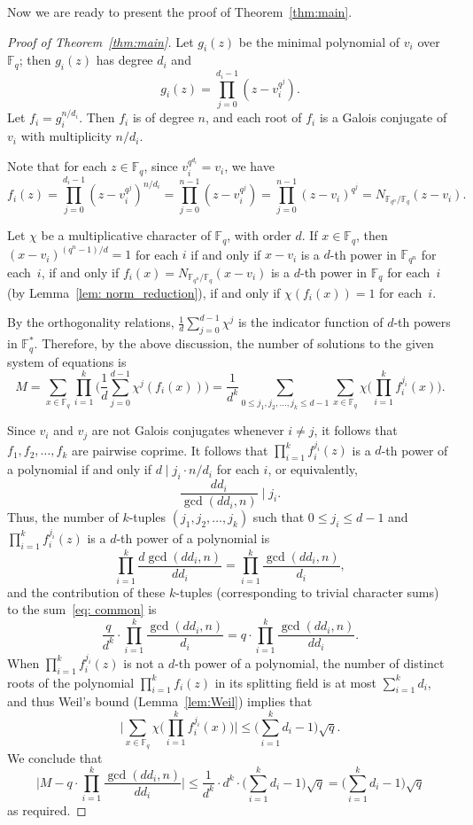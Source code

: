 \documentclass[12pt,reqno]{amsart}
\theoremstyle{definition}
\newcommand{\F}{\mathbb{F}}
\begin{document}
Now we are ready to present the proof of Theorem~\ref{thm:main}.

\begin{proof}[Proof of Theorem~\ref{thm:main}]
Let $g_i(z)$ be the minimal polynomial of $v_i$ over $\F_q$; then $g_i(z)$ has degree $d_i$ and 
$$
g_i(z)=\prod_{j=0}^{d_i-1} (z-v_i^{q^j}).
$$ 
Let $f_i=g_i^{n/d_i}$. Then $f_i$ is of degree $n$, and each root of $f_i$ is a Galois conjugate of $v_i$ with multiplicity $n/d_i$. 

Note that for each $z \in \F_q$, since $v_i^{q^{d_i}}=v_i$, we have
$$
f_i(z)=\prod_{j=0}^{d_i-1} (z-v_i^{q^j})^{n/d_i}=\prod_{j=0}^{n-1} (z-v_i^{q^j})=\prod_{j=0}^{n-1} (z-v_i)^{q^j}=N_{\F_{q^n}/\F_q}(z-v_i).
$$

Let $\chi$ be a multiplicative character of $\F_q$, with order $d$. If $x \in \F_q$, then $(x-v_i)^{(q^n-1)/d}=1$ for each $i$ if and only if $x-v_i$ is a $d$-th power in $\F_{q^n}$ for each~$i$, if and only if $f_i(x)=N_{\F_{q^n}/\F_q}(x-v_i)$ is a $d$-th power in $\F_q$ for each~$i$ (by Lemma~\ref{lem: norm_reduction}), if and only if $\chi(f_i(x))=1$ for each~$i$.

By the orthogonality relations, $\frac{1}{d} \sum_{j=0}^{d-1} \chi^j$ is the indicator function of $d$-th powers in $\F_q^*$. Therefore, by the above discussion, the number of solutions to the given system of equations is
\begin{equation} \label{eq: common}
 M=\sum_{x \in \F_q} \prod_{i=1}^k \bigg(\frac{1}{d} \sum_{j=0}^{d-1} \chi^j(f_i(x)) \bigg)=\frac{1}{d^k} \sum_{0 \leq j_1, j_2, \ldots, j_k \leq d-1}\sum_{x \in \F_q} \chi\bigg(\prod_{i=1}^k f_i^{j_i}(x)\bigg).   
\end{equation}

Since $v_i$ and $v_j$ are not Galois conjugates whenever $i \neq j$, it follows that $f_1, f_2, \ldots, f_k$ are pairwise coprime. It follows that $\prod_{i=1}^k f_i^{j_i}(z)$ is a $d$-th power of a polynomial if and only if $d \mid j_i \cdot n/d_i$ for each $i$, or equivalently,
$$
\frac{dd_i}{\gcd(dd_i,n)} \mid j_i.
$$
Thus, the number of $k$-tuples $(j_1,j_2, \ldots, j_k)$ such that $0 \leq j_i \leq d-1$ and $\prod_{i=1}^k f_i^{j_i}(z)$ is a $d$-th power of a polynomial is 
$$
\prod_{i=1}^k  \frac{d\gcd(dd_i,n)}{dd_i} =\prod_{i=1}^k  \frac{\gcd(dd_i,n)}{d_i} ,
$$
and the contribution of these $k$-tuples (corresponding to trivial character sums) to the sum~\eqref{eq: common} is
$$
\frac{q}{d^k} \cdot \prod_{i=1}^k  \frac{\gcd(dd_i,n)}{d_i}= q \cdot \prod_{i=1}^k  \frac{\gcd(dd_i,n)}{dd_i}.
$$
When $\prod_{i=1}^k f_i^{j_i}(z)$ is not a $d$-th power of a polynomial, the  number of distinct roots of the polynomial $\prod_{i=1}^{k} f_i(z)$ in its splitting field is at most $\sum_{i=1}^k d_i$, and thus Weil's bound (Lemma~\ref{lem:Weil}) implies that 
$$
\bigg|\sum_{x \in \F_q} \chi\bigg(\prod_{i=1}^k f_i^{j_i}(x)\bigg)\bigg| \leq \bigg(\sum_{i=1}^k d_i {}-1\bigg)\sqrt{q}.
$$
We conclude that
$$
\bigg|M-q \cdot \prod_{i=1}^k  \frac{\gcd(dd_i,n)}{dd_i}\bigg| \leq \frac{1}{d^k} \cdot d^k \cdot \bigg(\sum_{i=1}^k d_i {}-1\bigg)\sqrt{q}=\bigg(\sum_{i=1}^k d_i {}-1\bigg)\sqrt{q}
$$
as required.
\end{proof}
\end{document}
